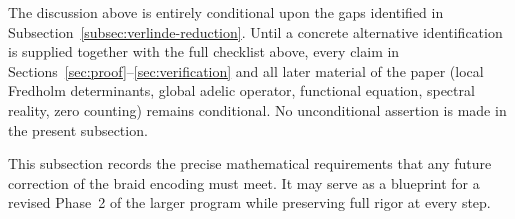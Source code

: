 \begin{note}
The discussion above is entirely conditional upon the gaps identified in Subsection~\ref{subsec:verlinde-reduction}. Until a concrete alternative identification is supplied together with the full checklist above, every claim in Sections~\ref{sec:proof}--\ref{sec:verification} and all later material of the paper (local Fredholm determinants, global adelic operator, functional equation, spectral reality, zero counting) remains conditional. No unconditional assertion is made in the present subsection.
\end{note}

This subsection records the precise mathematical requirements that any future correction of the braid encoding must meet. It may serve as a blueprint for a revised Phase~2 of the larger program while preserving full rigor at every step.